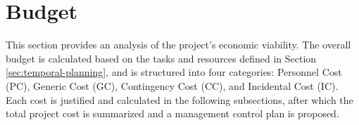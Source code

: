 
\section{Budget}
\label{sec:budget}

This section provides an analysis of the project's economic viability. The overall budget is calculated based on the tasks and resources defined in Section \ref{sec:temporal-planning}, and is structured into four categories: Personnel Cost (PC), Generic Cost (GC), Contingency Cost (CC), and Incidental Cost (IC). Each cost is justified and calculated in the following subsections, after which the total project cost is summarized and a management control plan is proposed.





